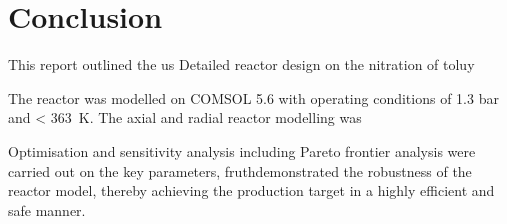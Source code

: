 \section{Conclusion} \label{sec:conclusion}
This report outlined the us
Detailed reactor design on the nitration of toluy

The reactor was modelled on COMSOL 5.6 with operating conditions of 1.3 bar and \SI{< 363}{\K}.
The axial and radial reactor modelling was 

Optimisation and sensitivity analysis including Pareto frontier analysis were carried out on the key parameters, fruthdemonstrated the robustness of the reactor model, thereby achieving the production target in a highly efficient and safe manner. 